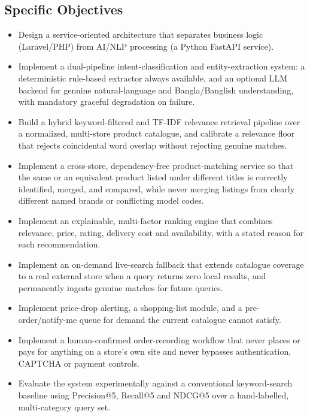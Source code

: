 \documentclass[12pt,a4paper]{report}
\begin{document}
\subsection{Specific Objectives}
\begin{itemize}
\item Design a service-oriented architecture that separates business logic (Laravel/PHP) from AI/NLP
processing (a Python FastAPI service).
\item Implement a dual-pipeline intent-classification and entity-extraction system: a deterministic
rule-based extractor always available, and an optional LLM backend for genuine natural-language and
Bangla/Banglish understanding, with mandatory graceful degradation on failure.
\item Build a hybrid keyword-filtered and TF-IDF relevance retrieval pipeline over a normalized,
multi-store product catalogue, and calibrate a relevance floor that rejects coincidental word overlap
without rejecting genuine matches.
\item Implement a cross-store, dependency-free product-matching service so that the same or an equivalent
product listed under different titles is correctly identified, merged, and compared, while never merging
listings from clearly different named brands or conflicting model codes.
\item Implement an explainable, multi-factor ranking engine that combines relevance, price, rating,
delivery cost and availability, with a stated reason for each recommendation.
\item Implement an on-demand live-search fallback that extends catalogue coverage to a real external store
when a query returns zero local results, and permanently ingests genuine matches for future queries.
\item Implement price-drop alerting, a shopping-list module, and a pre-order/notify-me queue for demand the
current catalogue cannot satisfy.
\item Implement a human-confirmed order-recording workflow that never places or pays for anything on a
store's own site and never bypasses authentication, CAPTCHA or payment controls.
\item Evaluate the system experimentally against a conventional keyword-search baseline using Precision@5,
Recall@5 and NDCG@5 over a hand-labelled, multi-category query set.
\end{itemize}
\end{document}
